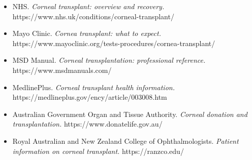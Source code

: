 \begin{itemize}
    \item NHS. \textit{Corneal transplant: overview and recovery.} https://www.nhs.uk/conditions/corneal-transplant/
    \item Mayo Clinic. \textit{Cornea transplant: what to expect.} https://www.mayoclinic.org/tests-procedures/cornea-transplant/
    \item MSD Manual. \textit{Corneal transplantation: professional reference.} https://www.msdmanuals.com/
    \item MedlinePlus. \textit{Corneal transplant health information.} https://medlineplus.gov/ency/article/003008.htm
    \item Australian Government Organ and Tissue Authority. \textit{Corneal donation and transplantation.} https://www.donatelife.gov.au/
    \item Royal Australian and New Zealand College of Ophthalmologists. \textit{Patient information on corneal transplant.} https://ranzco.edu/
\end{itemize}

